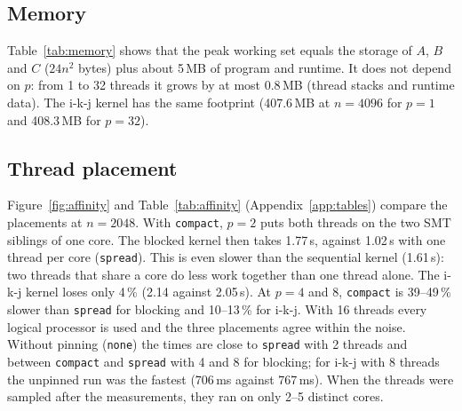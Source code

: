 \documentclass[11pt,a4paper]{article}
\begin{document}
\begin{table}[H]
\centering
\caption{$p=8$ in the main study (12 Nov., 5 repetitions) and in the follow-up (13 Nov.,
15 repetitions), both against the sequential medians of the main study. Last column: the main
study's speed-up with $p=6$, for comparison (\texttt{results/summary/repeat\_p8.csv}).}
\label{tab:repeat8}
\small\resizebox{\linewidth}{!}{\RepeatEightTable}
\end{table}

\subsection{Memory}
Table~\ref{tab:memory} shows that the peak working set equals the storage of $A$, $B$ and $C$
($24n^2$ bytes) plus about 5\,MB of program and runtime. It does not depend on $p$: from 1 to
32 threads it grows by at most 0.8\,MB (thread stacks and runtime data). The i-k-j kernel has the
same footprint (407.6\,MB at $n=4096$ for $p=1$ and 408.3\,MB for $p=32$).

\begin{table}[H]
\centering
\caption{Peak working set of the blocked kernel and peak number of OS threads of the process.}
\label{tab:memory}
\small\resizebox{\linewidth}{!}{\MemoryTable}
\end{table}

\subsection{Thread placement}\label{sec:place}
Figure~\ref{fig:affinity} and Table~\ref{tab:affinity} (Appendix~\ref{app:tables}) compare the placements at $n=2048$.
With \texttt{compact}, $p=2$ puts both threads on the two SMT siblings of one core. The blocked
kernel then takes 1.77\,s, against 1.02\,s with one thread per core (\texttt{spread}). This
is even slower than the sequential kernel (1.61\,s): two threads that share a core do less
work together than one thread alone. The i-k-j kernel loses only 4\,\% (2.14 against
2.05\,s). At $p=4$ and 8, \texttt{compact} is 39--49\,\% slower than \texttt{spread} for
blocking and 10--13\,\% for i-k-j. With 16 threads every logical
processor is used and the three placements agree within the noise. Without pinning
(\texttt{none}) the times are close to \texttt{spread} with 2 threads and between
\texttt{compact} and \texttt{spread} with 4 and 8 for blocking; for i-k-j with 8 threads the
unpinned run was the fastest (706\,ms against 767\,ms). When the threads were sampled
after the measurements, they ran on only 2--5 distinct cores.
\end{document}

